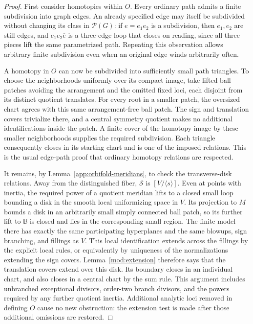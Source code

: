 \documentclass[11pt,reqno]{amsart}
\numberwithin{equation}{section}
\theoremstyle{definition}
\theoremstyle{remark}
\newcommand{\BB}{\mathbb B}
\newcommand{\cS}{\mathcal S}
\begin{document}
\begin{proof}
First consider homotopies within $O$.  Every ordinary path admits a
finite subdivision into graph edges.  An already specified edge may
itself be subdivided without changing its class in $\mathcal P(G)$:
if $e=e_1e_2$ is a subdivision, then $e_1,e_2$ are still edges, and
$e_1e_2\overline e$ is a three-edge loop that closes on reading,
since all three pieces lift the same parametrized path.  Repeating
this observation allows arbitrary finite subdivision even when an
original edge winds arbitrarily often.

A homotopy in $O$ can now be subdivided into sufficiently small path
triangles.  To choose the neighborhoods uniformly over its compact
image, take lifted ball patches avoiding the arrangement and the
omitted fixed loci, each disjoint from its distinct quotient
translates.  For every root in a smaller patch, the oversized chart
agrees with this same arrangement-free ball patch.  The sign and
translation covers trivialize there, and a central symmetry quotient
makes no additional identifications inside the patch.  A finite
cover of the homotopy image by these smaller neighborhoods supplies
the required subdivision.  Each triangle consequently closes in its
starting chart and is one of the imposed relations.  This is the
usual edge-path proof that ordinary homotopy relations are respected.

It remains, by Lemma~\ref{app:orbifold-meridians}, to check the
transverse-disk relations.  Away from the distinguished fiber,
$\cS$ is $[V/\langle s\rangle]$.  Even at points with inertia, the
required power of a quotient meridian lifts to a closed small loop
bounding a disk in the smooth local uniformizing space in $V$.
Its projection to $M$ bounds a disk in an arbitrarily small
simply connected ball patch, so its further lift to $\BB$ is closed
and lies in the corresponding small region.  The finite model there
has exactly the same participating hyperplanes and the same blowups, sign branching, and fillings as
$V$.  This local identification extends across the fillings by the
explicit local rules, or equivalently by uniqueness of the
normalizations extending the sign covers.  Lemma~\ref{mod:extension}
therefore says that the translation covers extend over this disk.
Its boundary closes in an individual chart, and also closes in a
central chart by the sum rule.  This argument includes unbranched
exceptional divisors, order-two branch divisors, and the powers
required by any further quotient inertia.  Additional analytic loci
removed in defining $O$ cause no new obstruction: the extension test
is made after those additional omissions are restored.


\end{proof}
\end{document}
